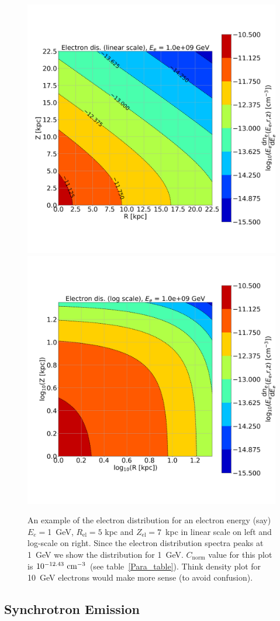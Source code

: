 \documentclass[usenatbib]{mnras}
\newcommand{\Andrew}[1]{\textcolor{dg}{#1}}
\begin{document}
\begin{figure}
\centering
\includegraphics[width=0.49\linewidth]{Images/Linear_EdNdE.png}%
\includegraphics[width = 0.49\linewidth]{Images/Log_EdNdE.png}
\caption{An example of the electron distribution for an electron energy (say) $E_e = $1~GeV, $R_{\mathrm{el}} = 5$ kpc and $Z_{\mathrm{el}} = 7$~kpc in linear scale on left and log-scale on right. Since the electron distribution spectra peaks at 1~GeV we show the distribution for 1~GeV. $C_\mathrm{norm}$ value for this plot is $10^{-12.43}~{\rm cm}^{-3}$ (see table~\ref{Para_table}). \Andrew{Think density plot for 10~GeV electrons would make more sense (to avoid confusion).}}  %
\label{fig:electron_density}
\end{figure}


\subsection{Synchrotron Emission}\label{Synchrotron_theory}
\end{document}
